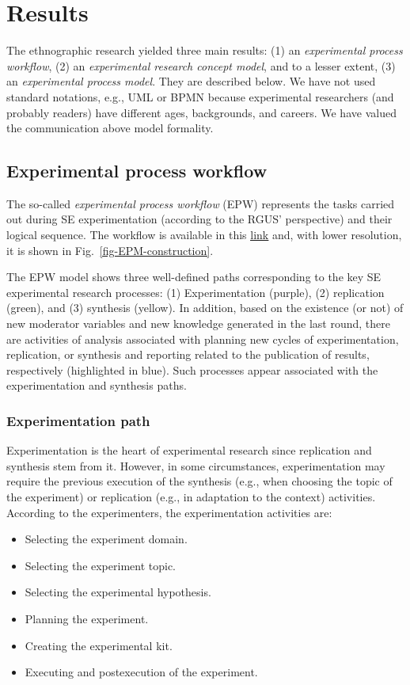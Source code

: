 \section{Results}\label{sec-results}
The ethnographic research yielded three main results: (1) an \textit{experimental process workflow}, (2) an \textit{experimental research concept model}, and to a lesser extent, (3) an \textit{experimental process model}. They are described below. We have not used standard notations, e.g., UML or BPMN because experimental researchers (and probably readers) have different ages, backgrounds, and careers. We have valued the communication above model formality.

\subsection{Experimental process workflow}

The so-called \textit{experimental process workflow} (EPW) represents the tasks carried out during SE experimentation (according to the RGUS' perspective) and their logical sequence. The workflow is available in this \href{https://zenodo.org/record/7102486#.YyuKruzMLUI}{\ul{link}} and, with lower resolution, it is shown in Fig.~\ref{fig-EPM-construction}.

The EPW model shows three well-defined paths corresponding to the key SE experimental research processes: (1) Experimentation (purple), (2) replication (green), and (3) synthesis (yellow). In addition, based on the existence (or not) of new moderator variables and new knowledge generated in the last round, there are activities of analysis associated with planning new cycles of experimentation, replication, or synthesis and reporting related to the publication of results, respectively (highlighted in blue). Such processes appear associated with the experimentation and synthesis paths.

\subsubsection{Experimentation path}
Experimentation is the heart of experimental research since replication and synthesis stem from it. However, in some circumstances, experimentation may require the previous execution of the synthesis (e.g., when choosing the topic of the experiment) or replication (e.g., in adaptation to the context) activities. According to the experimenters, the experimentation activities are:
\begin{itemize}
	\item Selecting the experiment domain.
	\item Selecting the experiment topic.
	\item Selecting the experimental hypothesis.
	\item Planning the experiment.
	\item Creating the experimental kit.
	\item Executing and postexecution of the experiment.
\end{itemize}

